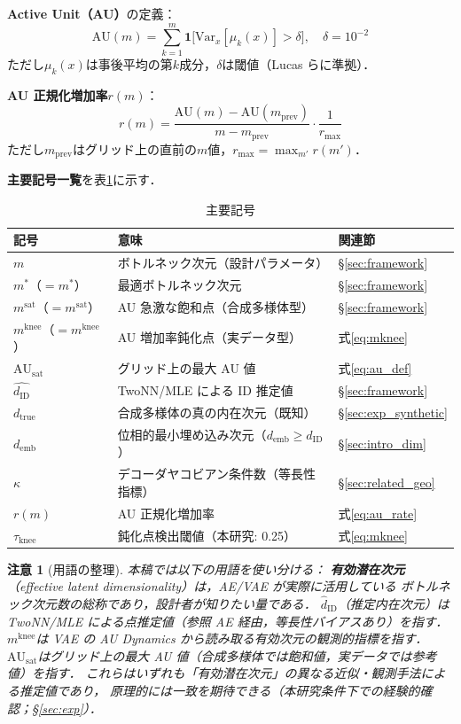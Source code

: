 \documentclass[11pt,a4paper]{jsarticle}
\newtheorem{remark}{注意}
\newcommand{\dID}{d_{\mathrm{ID}}}
\newcommand{\dzopt}{m^*}
\newcommand{\dtrue}{d_{\mathrm{true}}}
\newcommand{\kap}{\kappa}
\newcommand{\AUsat}{\mathrm{AU}_{\mathrm{sat}}}
\newcommand{\dzsat}{m^{\mathrm{sat}}}
\newcommand{\mknee}{m^{\mathrm{knee}}}
\newcommand{\demb}{d_{\mathrm{emb}}}
\begin{document}
\textbf{Active Unit（AU）}の定義：
\begin{equation}
  \mathrm{AU}(m) = \sum_{k=1}^{m} \mathbf{1}\bigl[\mathrm{Var}_x[\mu_k(x)] > \delta\bigr],
  \quad \delta = 10^{-2}
  \label{eq:au_def}
\end{equation}
ただし$\mu_k(x)$は事後平均の第$k$成分，$\delta$は閾値（Lucas ら\cite{lucas2019elbo}に準拠）．

\textbf{AU 正規化増加率}$r(m)$：
\begin{equation}
  r(m) = \frac{\mathrm{AU}(m) - \mathrm{AU}(m_{\mathrm{prev}})}{m - m_{\mathrm{prev}}} \cdot \frac{1}{r_{\max}}
  \label{eq:au_rate}
\end{equation}
ただし$m_{\mathrm{prev}}$はグリッド上の直前の$m$値，$r_{\max} = \max_{m'} r(m')$．

\textbf{主要記号一覧}を表\ref{tab:notation}に示す．

\begin{table}[H]
\centering
\caption{主要記号}
\label{tab:notation}
\small
\begin{tabular}{lll}
\toprule
記号 & 意味 & 関連節 \\
\midrule
$m$ & ボトルネック次元（設計パラメータ） & §\ref{sec:framework} \\
$\dzopt$（$= m^*$） & 最適ボトルネック次元 & §\ref{sec:framework} \\
$\dzsat$（$= m^{\mathrm{sat}}$） & AU 急激な飽和点（合成多様体型） & §\ref{sec:framework} \\
$\mknee$（$= m^{\mathrm{knee}}$） & AU 増加率鈍化点（実データ型） & 式\eqref{eq:mknee} \\
$\AUsat$ & グリッド上の最大 AU 値 & 式\eqref{eq:au_def} \\
$\hat{\dID}$ & TwoNN/MLE による ID 推定値 & §\ref{sec:framework} \\
$\dtrue$ & 合成多様体の真の内在次元（既知） & §\ref{sec:exp_synthetic} \\
$\demb$ & 位相的最小埋め込み次元（$\demb \geq \dID$） & §\ref{sec:intro_dim} \\
$\kap$ & デコーダヤコビアン条件数（等長性指標） & §\ref{sec:related_geo} \\
$r(m)$ & AU 正規化増加率 & 式\eqref{eq:au_rate} \\
$\tau_{\mathrm{knee}}$ & 鈍化点検出閾値（本研究: 0.25） & 式\eqref{eq:mknee} \\
\bottomrule
\end{tabular}
\end{table}

\begin{remark}[用語の整理]
本稿では以下の用語を使い分ける：
\textbf{有効潜在次元}（effective latent dimensionality）は，AE/VAE が実際に活用している
ボトルネック次元数の総称であり，設計者が知りたい量である．
\textbf{$\hat{d}_\mathrm{ID}$}（推定内在次元）は TwoNN/MLE による点推定値（参照 AE 経由，等長性バイアスあり）を指す．
\textbf{$\mknee$}は VAE の AU Dynamics から読み取る有効次元の観測的指標を指す．
\textbf{$\AUsat$}はグリッド上の最大 AU 値（合成多様体では飽和値，実データでは参考値）を指す．
これらはいずれも「有効潜在次元」の異なる近似・観測手法による推定値であり，
原理的には一致を期待できる（本研究条件下での経験的確認；§\ref{sec:exp}）．
\end{remark}
\end{document}
